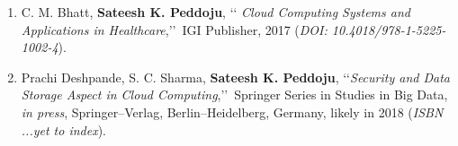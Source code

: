 \begin{enumerate}
	
	\item%
	C. M. Bhatt, \textbf{Sateesh K. Peddoju}, \lq\lq
	\emph{Cloud Computing Systems and Applications in Healthcare},\rq\rq\, IGI Publisher, 2017
	(\emph{DOI: 10.4018/978-1-5225-1002-4}).
	
	\item%
	Prachi Deshpande, S. C. Sharma, \textbf{Sateesh K. Peddoju},
	\lq\lq \emph{Security and Data Storage Aspect in Cloud Computing},\rq\rq\, Springer Series in
	Studies in Big Data, \textit{in press}, Springer--Verlag, Berlin--Heidelberg,
	Germany, likely in 2018 (\emph{ISBN ...yet to index}).

\end{enumerate}
